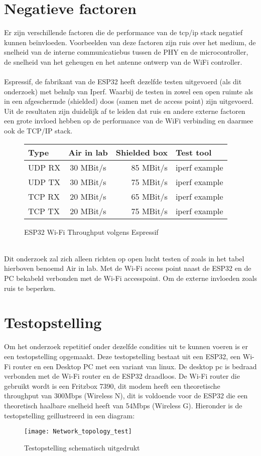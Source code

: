\documentclass[../DCM2_Verslag.tex]{subfiles}
\begin{document}
\section{Negatieve factoren}
Er zijn verschillende factoren die de performance van de tcp/ip stack negatief kunnen beïnvloeden. Voorbeelden van deze factoren zijn ruis over het medium, de snelheid van de interne communicatiebus tussen de PHY en de microcontroller, de snelheid van het geheugen en het antenne ontwerp van de WiFi controller.\\\\
Espressif, de fabrikant van de ESP32 heeft dezelfde testen uitgevoerd (als dit onderzoek) met behulp van Iperf. Waarbij de testen in zowel een open ruimte als in een afgeschermde (shielded) doos (samen met de access point) zijn uitgevoerd. Uit de resultaten zijn duidelijk af te leiden dat ruis en andere externe factoren een grote invloed hebben op de performance van de WiFi verbinding en daarmee ook de TCP/IP stack.\\
\begin{figure}[h]
\begin{tabular}{||l|c|r|p{6cm}||}
	 \hline
 	 Type & Air in lab & Shielded box & Test tool \\
  	 \hline \hline    
   	 UDP RX & 30 MBit/s & 85 MBit/s & iperf example \\
   	 UDP TX & 30 MBit/s & 75 MBit/s & iperf example \\
   	 TCP RX & 20 MBit/s & 65 MBit/s & iperf example \\
   	 TCP TX & 20 MBit/s & 75 MBit/s & iperf example \\
\end{tabular}
\caption{ESP32 Wi-Fi Throughput volgens Espressif}
\end{figure}
\\Dit onderzoek zal zich alleen richten op open lucht testen of zoals in het tabel hierboven benoemd Air in lab. Met de Wi-Fi access point naast de ESP32 en de PC bekabeld verbonden met de Wi-Fi accesspoint. Om de externe invloeden zoals ruis te beperken.

\section{Testopstelling}
Om het onderzoek repetitief onder dezelfde condities uit te kunnen voeren is er een testopstelling opgemaakt. Deze testopstelling bestaat uit een ESP32, een Wi-Fi router en een Desktop PC met een variant van linux. De desktop pc is bedraad verbonden met de Wi-Fi router en de ESP32 draadloos. De Wi-Fi router die gebruikt wordt is een Fritzbox 7390, dit modem heeft een theoretische throughput van 300Mbps (Wireless N), dit is voldoende voor de ESP32 die een theoretisch haalbare snelheid heeft van 54Mbps (Wireless G). Hieronder is de testopstelling geillustreerd in een diagram:
\begin{figure}[h]
\centering
\texttt{[image: Network\_topology\_test]}
\caption{Testopstelling schematisch uitgedrukt}
\end{figure}
\end{document}
